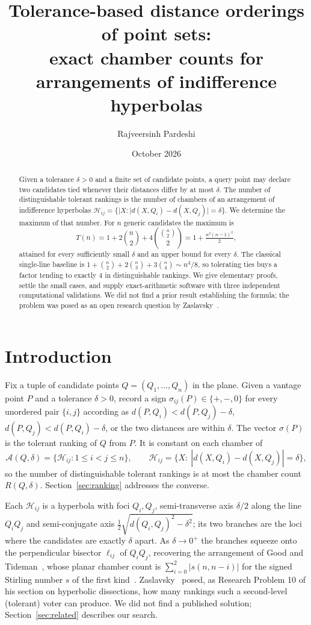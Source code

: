 ﻿\documentclass[11pt,a4paper]{article}
\title{\bfseries Tolerance-based distance orderings of point sets:\\
exact chamber counts for arrangements of indifference hyperbolas}
\author{Rajveersinh Pardeshi}
\date{October 2026}
\theoremstyle{definition}
\theoremstyle{remark}
\newcommand{\HH}{\mathcal{H}}
\newcommand{\ARR}{\mathcal{A}}
\begin{document}
\maketitle

\begin{abstract}
Given a tolerance $\delta>0$ and a finite set of candidate points, a query point
may declare two candidates tied whenever their distances differ by at most
$\delta$.  The number of distinguishable tolerant rankings is the number of
chambers of an arrangement of indifference hyperbolas
$\HH_{ij}=\{|X:|d(X,Q_i)-d(X,Q_j)|=\delta\}$.  We determine the maximum of that
number.  For $n$ generic candidates the maximum is
\[
T(n)=1+2\binom{n}{2}+4\binom{\binom{n}{2}}{2}=1+\tfrac{n^{2}(n-1)^{2}}{2},
\]
attained for every sufficiently small $\delta$ and an upper bound for every
$\delta$.  The classical single-line baseline is
$1+\binom n2+2\binom n3+3\binom n4\sim n^4/8$, so tolerating ties buys a factor
tending to exactly $4$ in distinguishable rankings.  We give elementary proofs,
settle the small cases, and supply exact-arithmetic software with three
independent computational validations.  We did not find a prior result
establishing the formula; the problem was posed as an open research question by
Zaslavsky~\cite{zaslavsky2002}.
\end{abstract}

\section{Introduction}
\label{sec:intro}

Fix a tuple of candidate points $Q=(Q_1,\dots,Q_n)$ in the plane.  Given a
vantage point $P$ and a tolerance $\delta>0$, record a sign
$\sigma_{ij}(P)\in\{+,-,0\}$ for every unordered pair $\{i,j\}$ according as
$d(P,Q_i)<d(P,Q_j)-\delta$, $d(P,Q_j)<d(P,Q_i)-\delta$, or the two distances are
within $\delta$.  The vector $\sigma(P)$ is the tolerant ranking of $Q$ from
$P$.  It is constant on each chamber of
\[
\ARR(Q,\delta)=\{\HH_{ij}:1\le i<j\le n\},\qquad
\HH_{ij}=\{X:\ |d(X,Q_i)-d(X,Q_j)|=\delta\},
\]
so the number of distinguishable tolerant rankings is at most the chamber count
$R(Q,\delta)$.  Section~\ref{sec:ranking} addresses the converse.

Each $\HH_{ij}$ is a hyperbola with foci $Q_i,Q_j$, semi-transverse axis
$\delta/2$ along the line $Q_iQ_j$ and semi-conjugate axis
$\tfrac12\sqrt{d(Q_i,Q_j)^2-\delta^2}$; its two branches are the loci where the
candidates are exactly $\delta$ apart.  As $\delta\to0^{+}$ the branches squeeze
onto the perpendicular bisector $\ell_{ij}$ of $Q_iQ_j$, recovering the
arrangement of Good and Tideman~\cite{good1977}, whose planar chamber count is
$\sum_{i=0}^{2}|s(n,n-i)|$ for the signed Stirling number $s$ of the first
kind~\cite{zaslavsky2002}.  Zaslavsky~\cite{zaslavsky2002} posed, as Research
Problem 10 of his section on hyperbolic dissections, how many rankings such a
second-level (tolerant) voter can produce.  We did not find a published
solution; Section~\ref{sec:related} describes our search.
\end{document}
